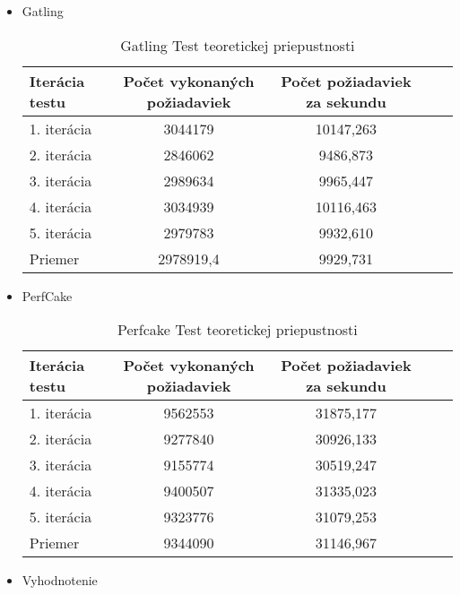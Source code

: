 \documentclass[12pt,oneside,final]{fithesis-utf8}
\begin{document}
\begin{itemize}
\item Gatling

\begin{table}[H]
\begin{center}
\begin{tabular}{ | l | c | c | c | c |}
		\hline
		 \textbf{Iterácia testu} & \textbf{Počet vykonaných požiadaviek} & \textbf{Počet požiadaviek za sekundu} \\ \hline
		 1. iterácia & 3044179 & 10147,263 \\ \hline
		 2. iterácia & 2846062 & 9486,873 \\ \hline
		 3. iterácia & 2989634 & 9965,447 \\ \hline
		 4. iterácia & 3034939 & 10116,463 \\ \hline
		 5. iterácia & 2979783 & 9932,610 \\ \hline
		 Priemer & 2978919,4 & 9929,731 \\ \hline
		 
\end{tabular}
\end{center}
\caption{Gatling Test teoretickej priepustnosti}
\end{table}

\newpage
\item PerfCake

\begin{table}[H]
\begin{center}
\begin{tabular}{ | l | c | c | c | c |}
		\hline
		 \textbf{Iterácia testu} & \textbf{Počet vykonaných požiadaviek} & \textbf{Počet požiadaviek za sekundu} \\ \hline
		 1. iterácia & 9562553 & 31875,177 \\ \hline
		 2. iterácia & 9277840 & 30926,133 \\ \hline
		 3. iterácia & 9155774 & 30519,247 \\ \hline
		 4. iterácia & 9400507 & 31335,023 \\ \hline
		 5. iterácia & 9323776 & 31079,253 \\ \hline
		 Priemer & 9344090 & 31146,967 \\ \hline
		 
\end{tabular}
\end{center}
\caption{Perfcake Test teoretickej priepustnosti}
\end{table}

\item Vyhodnotenie


\end{itemize}
\end{document}
